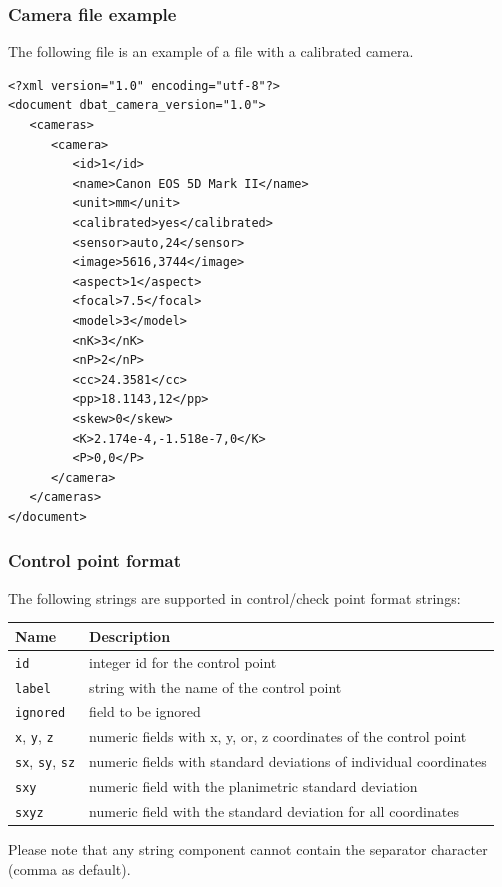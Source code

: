 \documentclass{article}
\begin{document}
\subsubsection{Camera file example}
\label{sec:camFileExample}
The following file is an example of a file with a calibrated camera.
\begin{verbatim}
<?xml version="1.0" encoding="utf-8"?>
<document dbat_camera_version="1.0">
   <cameras>
      <camera>
         <id>1</id>
         <name>Canon EOS 5D Mark II</name>
         <unit>mm</unit>
         <calibrated>yes</calibrated>
         <sensor>auto,24</sensor>
         <image>5616,3744</image>
         <aspect>1</aspect>
         <focal>7.5</focal>
         <model>3</model>
         <nK>3</nK>
         <nP>2</nP>
         <cc>24.3581</cc>
         <pp>18.1143,12</pp>
         <skew>0</skew>
         <K>2.174e-4,-1.518e-7,0</K>
         <P>0,0</P>
      </camera>
   </cameras>
</document>
\end{verbatim}
\subsubsection{Control point format}
\label{sec:ctrlFormat}
The following strings are supported in control/check point format
strings:
\begin{center}
\begin{tabular}{l|l}
Name & Description\\
\hline
\texttt{id} & integer id for the control point\\
\texttt{label} & string with the name of the control point\\
\texttt{ignored} & field to be ignored\\
\texttt{x}, \texttt{y}, \texttt{z} & numeric fields with x, y, or, z coordinates of the control point\\
\texttt{sx}, \texttt{sy}, \texttt{sz} & numeric fields with standard deviations of individual coordinates\\
\texttt{sxy} & numeric field with the planimetric standard deviation\\
\texttt{sxyz} & numeric field with the standard deviation for all coordinates\\
\end{tabular}
\end{center}
Please note that any string component cannot contain the separator
character (comma as default).
\end{document}
